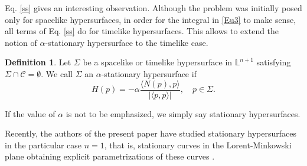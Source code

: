 \documentclass[a4paper,12pt]{amsart}
\theoremstyle{definition}
\newtheorem{definition}[theorem]{Definition}
\def\l{\mathbb L}
\begin{document}
Eq. \eqref{ss} gives an     interesting observation. Although the problem was initially posed only for spacelike hypersurfaces, in order for the integral in \eqref{Eu3} to make sense, all terms of Eq.  \eqref{ss} do  for timelike hypersurfaces. This allows to extend the notion of $\alpha$-stationary hypersurface to the timelike case.  

 
\begin{definition} \label{dss}
Let $\Sigma$ be a spacelike or timelike hypersurface in $\l^{n+1}$ satisfying $\Sigma \cap \mathcal{C} = \emptyset$. We call $\Sigma$ an $\alpha$-stationary hypersurface if  
\begin{equation}
H(p)=-\alpha \frac{ \langle N(p),p\rangle}{|\langle p,p\rangle|}, \quad p \in \Sigma. \label{eq1}
\end{equation}
\end{definition}
 
If the value of $\alpha$ is not to be emphasized, we simply say stationary hypersurfaces.

Recently, the authors of the present paper have studied stationary hypersurfaces in the particular case $n=1$, that is, stationary curves in the Lorent-Minkowski plane  obtaining explicit parametrizations of these curves \cite{al}.
\end{document}
